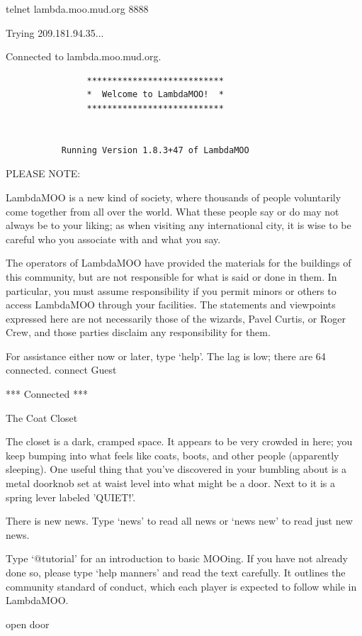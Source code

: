 \documentclass[10pt,twoside,openleft]{memoir}
\begin{document}
{\footnotesize
\ttfamily
\parindent0pt
\parskip6pt
telnet lambda.moo.mud.org 8888

Trying 209.181.94.35...

Connected to lambda.moo.mud.org.

\begin{verbatim}
                ***************************
                *  Welcome to LambdaMOO!  *
                ***************************


           Running Version 1.8.3+47 of LambdaMOO
\end{verbatim}

PLEASE NOTE:

LambdaMOO is a new kind of society, where thousands of people voluntarily
come together from all over the world.  What these people say or do may not
always be to your liking; as when visiting any international city, it is wise
to be careful who you associate with and what you say.

The operators of LambdaMOO have provided the materials for the buildings of
this community, but are not responsible for what is said or done in them.  In
particular, you must assume responsibility if you permit minors or others to
access LambdaMOO through your facilities.  The statements and viewpoints
expressed here are not necessarily those of the wizards, Pavel Curtis,
or Roger Crew, and those parties disclaim any responsibility for them.

For assistance either now or later, type `help'.
The lag is low; there are 64 connected.
connect Guest

*** Connected ***

The Coat Closet

The closet is a dark, cramped space.  It appears  to be very crowded in here; you keep bumping into what feels like coats,  boots, and other people (apparently sleeping).  One useful thing that you've  discovered in your bumbling about is a metal doorknob set at waist level into  what might be a door.  Next to it is a spring lever labeled 'QUIET!'.

There is new news.  Type `news' to read all news or `news new' to read just new news.

Type `@tutorial' for an introduction to basic MOOing.  If you have not already done so, please type `help manners' and read the text carefully.  It outlines the community standard of conduct, which each player is expected to follow while in LambdaMOO.

open door

}
\end{document}
